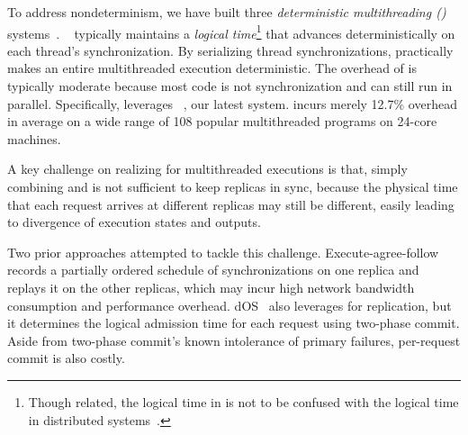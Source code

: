 
To address nondeterminism, we have built three \emph{deterministic 
multithreading (\dmt)} systems~\cite{cui:tern:osdi10, peregrine:sosp11, 
parrot:sosp13}. \dmt~\cite{dpj:oopsla09,dmp:asplos09,kendo:asplos09,
coredet:asplos10, 
dos:osdi10,ddos:asplos13,ics:oopsla13} typically maintains a \emph{logical 
time}\footnote{Though related, the logical time in \dmt is not to 
be confused with the logical time in distributed systems~\cite{lamportclock}.} 
that advances deterministically on each thread's synchronization. By 
serializing thread synchronizations, \dmt practically makes an entire 
multithreaded execution deterministic. The overhead of \dmt is typically 
moderate because most code is not synchronization and can still run in parallel. 
Specifically, \xxx leverages \parrot~\cite{parrot:sosp13}, our latest \dmt 
system. \parrot incurs merely 12.7\% overhead in 
average on a wide range of 108 popular multithreaded programs on 24-core 
machines.

A key challenge on realizing \smr for multithreaded executions is that,
simply combining \paxos and \dmt is not sufficient to keep replicas in
sync, because the physical time that each request arrives at different
replicas may still be different, easily leading to divergence of execution
states and outputs.


Two prior approaches attempted to tackle this challenge.  
Execute-agree-follow~\cite{rex:eurosys14} records a partially
ordered schedule of \pthread synchronizations on one replica and replays it 
on the other replicas, which may incur high network bandwidth 
consumption and performance overhead. dOS~\cite{dos:osdi10} also leverages
\dmt for replication, but it determines the logical admission time for
each request using two-phase commit.  Aside from two-phase commit's known
intolerance of primary failures, per-request commit is also costly.


